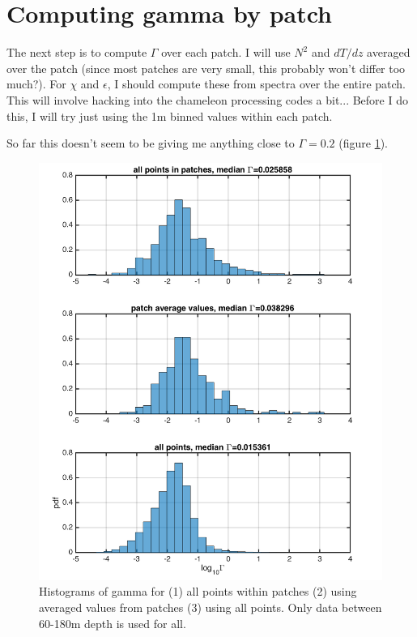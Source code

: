 \documentclass[11pt]{article}
\begin{document}
\clearpage
\section{Computing gamma by patch}

The next step is to compute $\Gamma$ over each patch. I will use $N^2$ and $dT/dz$ averaged over the patch (since most patches are very small, this probably won't differ too much?). For $\chi$ and $\epsilon$, I should compute these from spectra over the entire patch. This will involve hacking into the chameleon processing codes a bit... Before I do this, I will try just using the 1m binned values within each patch.

So far this doesn't seem to be giving me anything close to $\Gamma=0.2$ (figure \ref{hists_gamma_allVspatch}).

\begin{figure}[htbp]
\includegraphics[scale=0.8]{hists_gamma_allVspatch.png}
\caption{Histograms of gamma for (1) all points within patches (2) using averaged values from patches (3) using all points. Only data between 60-180m depth is used for all. }
\label{hists_gamma_allVspatch}
\end{figure}
\end{document}
